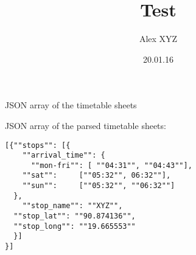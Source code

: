 \documentclass[xcolor=dvipsnames]{beamer}
\title{Test}
\author{Alex XYZ}
\institute{University XYZ}
\date{20.01.16}
\begin{document}
\beamertemplatenavigationsymbolsempty

\begin{frame}
\titlepage
\end{frame}

\begin{frame}[fragile]{JSON array of the timetable sheets}

JSON array of the parsed timetable sheets:
\bigbreak
\begin{tcolorbox}[enhanced,colback=white,colframe=white,sharpish corners,fuzzy halo=0.5mm with lightgray]
\begin{lstlisting}[style=json]
[{""stops"": [{
    ""arrival_time"": {
      ""mon-fri"": [ ""04:31"", ""04:43""],
    ""sat"":     [""05:32"", 06:32""],                                     
    ""sun"":     [""05:32"", ""06:32""]
  },   
    ""stop_name"": ""XYZ"",
  ""stop_lat"": ""90.874136"",
  ""stop_long"": ""19.665553""
  }]
}]
\end{lstlisting}
\end{tcolorbox}
\end{frame}
\end{document}
